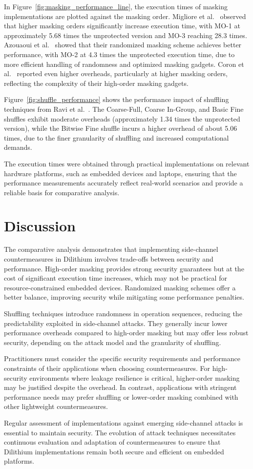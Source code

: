 In Figure~\ref{fig:masking_performance_line}, the execution times of masking implementations are plotted against the masking order. Migliore et al.~\cite{Migliore19} observed that higher masking orders significantly increase execution time, with MO-1 at approximately 5.68 times the unprotected version and MO-3 reaching 28.3 times. Azouaoui et al.~\cite{Azouaoui22} showed that their randomized masking scheme achieves better performance, with MO-2 at 4.3 times the unprotected execution time, due to more efficient handling of randomness and optimized masking gadgets. Coron et al.~\cite{Coron23} reported even higher overheads, particularly at higher masking orders, reflecting the complexity of their high-order masking gadgets.

Figure~\ref{fig:shuffle_performance} shows the performance impact of shuffling techniques from Ravi et al.~\cite{Ravi20}. The Coarse-Full, Coarse In-Group, and Basic Fine shuffles exhibit moderate overheads (approximately 1.34 times the unprotected version), while the Bitwise Fine shuffle incurs a higher overhead of about 5.06 times, due to the finer granularity of shuffling and increased computational demands.

The execution times were obtained through practical implementations on relevant hardware platforms, such as embedded devices and laptops, ensuring that the performance measurements accurately reflect real-world scenarios and provide a reliable basis for comparative analysis.

\section{Discussion}

The comparative analysis demonstrates that implementing side-channel countermeasures in Dilithium involves trade-offs between security and performance. High-order masking provides strong security guarantees but at the cost of significant execution time increases, which may not be practical for resource-constrained embedded devices. Randomized masking schemes offer a better balance, improving security while mitigating some performance penalties.

Shuffling techniques introduce randomness in operation sequences, reducing the predictability exploited in side-channel attacks. They generally incur lower performance overheads compared to high-order masking but may offer less robust security, depending on the attack model and the granularity of shuffling.

Practitioners must consider the specific security requirements and performance constraints of their applications when choosing countermeasures. For high-security environments where leakage resilience is critical, higher-order masking may be justified despite the overhead. In contrast, applications with stringent performance needs may prefer shuffling or lower-order masking combined with other lightweight countermeasures.

Regular assessment of implementations against emerging side-channel attacks is essential to maintain security. The evolution of attack techniques necessitates continuous evaluation and adaptation of countermeasures to ensure that Dilithium implementations remain both secure and efficient on embedded platforms.
